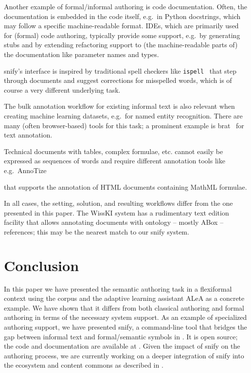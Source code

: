 \documentclass[runningheads]{llncs}
\def\edited#1{#1}
\newcommand\ALeA{\textsf{ALeA}\xspace}
\newcommand\snify{\textsf{snify}\xspace}
\begin{document}
Another example of formal/informal authoring is code documentation.
Often, the documentation is embedded in the code itself,
e.g.\ in Python docstrings, which may follow a specific
machine-readable format.
IDEs, which are primarily used for (formal) code authoring,
typically provide some support, e.g.\ by generating stubs
and by extending refactoring support
to (the machine-readable parts of) the documentation
like parameter names and types.

\snify's interface is inspired by traditional spell checkers
like \lstinline|ispell|~\cite{ispellman}
that step through documents and suggest corrections for misspelled words,
\edited{which is of course a very different underlying task.}

The bulk annotation workflow for existing informal text is also relevant when creating
machine learning datasets, e.g.\ for named entity recognition.  There are many (often
browser-based) tools for this task; a prominent example is
\textsf{brat}~\cite{brat:on} for text annotation.
\edited{
    Technical documents with tables, complex formulae, etc. cannot
    easily be expressed as sequences of words and require different annotation
    tools like} e.g.\ \textsf{AnnoTize}~\cite{PanzerSchaefer:AnnoTize23}
\edited{
    that supports the annotation of HTML documents containing MathML formulae.
}


In all cases, the setting, solution, and resulting workflows differ from the one presented
in this paper. The WissKI system \cite{goerz2010adaptation} has a rudimentary text edition
facility that allows annotating documents with ontology -- mostly ABox -- references; this
may be the nearest match to our \snify system.

\section{Conclusion}\label{sec:conclusion}
In this paper we have presented the semantic authoring task in a flexiformal context
using the \sTeX corpus and the adaptive learning assistant \ALeA as a concrete example. We
have shown that it differs from both classical authoring and formal authoring in terms of
the necessary system support. As an example of specialized authoring support, we have
presented \snify, a command-line tool that bridges the gap between informal text and
formal/semantic symbols in \sTeX.
\edited{It is open source; the code and documentation are available at}
\cite{stextools:git}.
Given the impact of \snify on the authoring process, we are
currently working on a deeper integration of \snify into the \sTeX ecosystem and content
commons as described in . 
\end{document}
